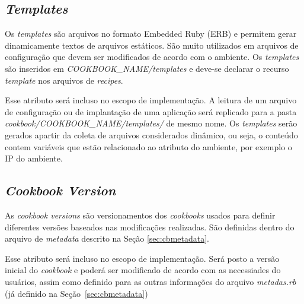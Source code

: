 \subsection{\textit{Templates}}

Os \textit{templates} são arquivos no formato Embedded Ruby (ERB) e permitem gerar
dinamicamente textos de arquivos estáticos. São muito utilizados em arquivos
de configuração que devem ser modificados de acordo com o ambiente. Os
\textit{templates} são inseridos em \textit{COOKBOOK\_NAME/templates} e deve-se declarar o recurso
\textit{template} nos arquivos de \textit{recipes}.

Esse atributo será incluso no escopo de implementação. A leitura de um arquivo de
configuração ou de implantação de uma aplicação será replicado para a
pasta \textit{cookbook/COOKBOOK\_NAME/templates/} de mesmo nome. Os \textit{templates} serão
gerados apartir da coleta de arquivos considerados din{\^a}mico, ou seja,
o conteúdo contem variáveis que estão relacionado ao atributo do ambiente,
por exemplo o IP do ambiente.

\subsection{\textit{Cookbook Version}}

As \textit{cookbook versions} são versionamentos dos \textit{cookbooks} usados para definir
diferentes versões baseados nas modificações realizadas. São definidas
  dentro do arquivo de \textit{metadata} descrito na Seção \ref{sec:cbmetadata}.

Esse atributo será incluso no escopo de implementação. Será posto a versão inicial
do \textit{cookbook} e poderá ser modificado de acordo com as necessiades do usuários,
assim como definido para as outras informações do arquivo \textit{metadas.rb} (já definido
na Seção~\ref{sec:cbmetadata})

